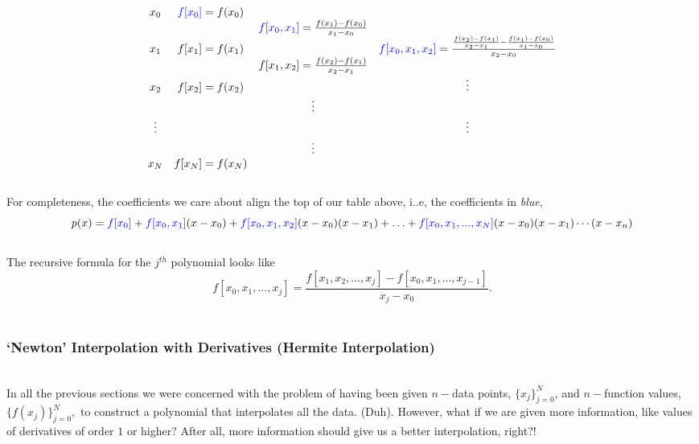 \documentclass[paper=a4, fontsize=11pt]{scrartcl} %
\numberwithin{equation}{section} %
\numberwithin{figure}{section} %
\numberwithin{table}{section} %
\begin{document}
$$\begin{array}{cccc}
x_0    &{\color{blue}{f[x_0]}}= f(x_0) &                                                   		       & \\
           &                       &{\color{blue}{f[x_0,x_1]}}=  \frac{ f(x_1)-f(x_0)}{x_1-x_0} &  \\
x_1    &f[x_1]= f(x_1) &						  	                                   &{\color{blue}{f[x_0,x_1,x_2]}} = \frac{ \frac{ f(x_2)-f(x_1)}{x_2-x_1} -   \frac{ f(x_1)-f(x_0)}{x_1-x_0}     }{x_2-x_0} \\
           &                       &f[x_1,x_2]= \frac{ f(x_2)-f(x_1)}{x_2-x_1} 			       & \\
x_2    &f[x_2]= f(x_2) & 						   	             	   	       & \vdots \\
           &                       &                   \vdots			  	            	                &   \\
\vdots&            		&							                                   & \vdots \\
	  &          		 &  		\vdots			  	      			       &   \\
x_N    & f[x_N]=f(x_N) & 						 	      			       &	  	
\end{array}$$\\

For completeness, the coefficients we care about align the top of our table above, i..e, the coefficients in \emph{blue}, \\
$$p(x) = {\color{blue}{f[x_0]}} + {\color{blue}{f[x_0,x_1]}} (x-x_0) + {\color{blue}{f[x_0,x_1,x_2]}}(x-x_0)(x-x_1) + \ldots + {\color{blue}{f[x_0,x_1,...,x_N]}} (x-x_0)(x-x_1)\cdots(x-x_n)$$\\
The recursive formula for the $j^{th}$ polynomial looks like
$$f[x_0,x_1,...,x_j] = \frac{  f[x_1,x_2,...,x_j] - f[x_0,x_1,...,x_{j-1}]  }{x_j-x_0}.$$\\



\subsubsection{`Newton' Interpolation with Derivatives (Hermite Interpolation)}

$ $\\

In all the previous sections we were concerned with the problem of having been given $n-$data points, $\{x_{j}\}_{j=0}^{N}$, and $n-$function values, $\{f(x_j)\}_{j=0}^{N},$ to construct a polynomial that interpolates all the data. (Duh). However, what if we are given more information, like values of derivatives of order $1$ or higher? After all, more information should give us a better interpolation, right?!\\ 
\end{document}
